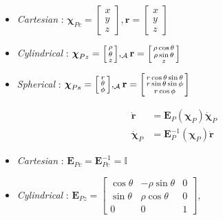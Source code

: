\documentclass[landscape,a0paper,fontscale=0.285]{baposter} %
\newcommand{\compresslist}{ %
\setlength{\itemsep}{1pt}
\setlength{\parskip}{0pt}
\setlength{\parsep}{0pt}
}
\renewenvironment{bmatrix}{\left[\begin{smallmatrix}}{\end{smallmatrix}\right]}
\begin{document}
\begin{poster}
{\begin{itemize}\compresslist
    \item \textit{Cartesian} : $\boldsymbol{\chi}_{Pc}=\left[\begin{smallmatrix}x\\y\\z\end{smallmatrix}\right], \mathbf{r}=\left[\begin{smallmatrix}x\\y\\z\end{smallmatrix}\right]$
    \item \textit{Cylindrical} : $\boldsymbol{\chi}_{Pz}=\begin{bmatrix}\rho\\\theta\\z\end{bmatrix},_{\mathcal{A}}\mathbf{r}=\begin{bmatrix}\rho \cos \theta \\\rho \sin\theta\\z\end{bmatrix}$
    \item \textit{Spherical} : $\boldsymbol{\chi}_{Ps}=\begin{bmatrix}r\\\theta\\\phi\end{bmatrix},_{\mathcal{A}}\mathbf{r}=\begin{bmatrix}r\cos\theta\sin\theta\\ r\sin\theta\sin\phi\\ r\cos\phi\end{bmatrix}$
\end{itemize}


\colorbox[HTML]{CCFFFF}{}
\[
\begin{aligned}
\dot {\mathbf{r}} &= \mathbf{E}_P(\boldsymbol{\chi}_P)\dot{\boldsymbol{\chi}}_P
\\
\dot{\boldsymbol{\chi}}_P &= \mathbf{E}_P^{-1}(\boldsymbol{\chi}_P)\dot{\mathbf{r}}
\end{aligned}
\]

\begin{itemize}\compresslist
    \item \textit{Cartesian} : $\mathbf{E}_{Pc} = \mathbf{E}_{Pc}^{-1} = \mathbb{I}$
    \item \textit{Cylindrical} : $\mathbf{E}_{Pz} = \left[\begin{smallmatrix} \cos\theta & -\rho\sin\theta & 0 \\ \sin\theta & \rho\cos\theta & 0 \\ 0 & 0 & 1 \end{smallmatrix}\right]$,
    

\end{itemize}}
\end{poster}
\end{document}

